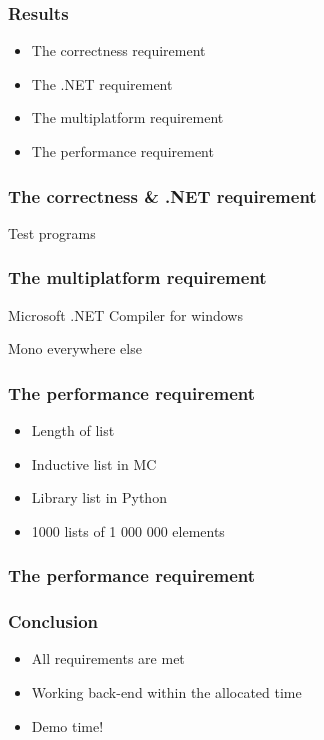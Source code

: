 \documentclass[xetex,serif]{beamer}
\begin{document}
\begin{frame}[t]
\end{frame}\begin{frame}\frametitle{Results}
\begin{itemize}
    \item The correctness requirement
    \item The .NET requirement
    \item The multiplatform requirement
    \item The performance requirement
\end{itemize}

\end{frame}\begin{frame}\frametitle{The correctness \& .NET requirement}
    Test programs

\end{frame}\begin{frame}\frametitle{The multiplatform requirement}
    Microsoft .NET Compiler for windows

    Mono everywhere else

\end{frame}\begin{frame}\frametitle{The performance requirement}
\begin{itemize}
    \item Length of list
    \item Inductive list in MC
    \item Library list in Python
    \item 1000 lists of 1 000 000 elements
\end{itemize}

\end{frame}\begin{frame}\frametitle{The performance requirement}

\end{frame}\begin{frame}\frametitle{Conclusion}
\begin{itemize}
    \item All requirements are met
    \item Working back-end within the allocated time
    \item Demo time!
\end{itemize}


\end{frame}
\end{document}
